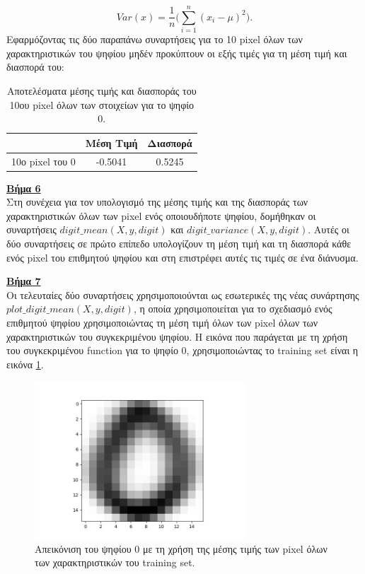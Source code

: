 \documentclass[11pt]{article} %
\begin{document}
\begin{equation}
\label{variance}
Var(x) = \frac{1}{n}\bigg(\sum_{i=1}^{n}(x_{i}-\mu)^{2}\bigg).
\end{equation}
Εφαρμόζοντας τις δύο παραπάνω συναρτήσεις για το 10 pixel όλων των χαρακτηριστικών του ψηφίου μηδέν προκύπτουν οι εξής τιμές για τη μέση τιμή και διασπορά του:

\begin{table}[h]
\begin{center}
\begin{tabular}{c c c}
\hline\hline
 & Μέση Τιμή & Διασπορά\\
\hline
10ο pixel του 0 & -0.5041 & 0.5245\\
\hline 
\end{tabular}
\caption{Αποτελέσματα μέσης τιμής και διασποράς του 10ου pixel όλων των στοιχείων για το ψηφίο 0.}
\end{center}
\end{table}

\underline{\textbf{Βήμα 6}}\\

Στη συνέχεια για τον υπολογισμό της μέσης τιμής και της διασποράς των χαρακτηριστικών όλων των pixel ενός οποιουδήποτε ψηφίου, δομήθηκαν οι συναρτήσεις $digit\_mean(X, y, digit)$ και $digit\_variance(X, y, digit)$. Αυτές οι δύο συναρτήσεις σε πρώτο επίπεδο υπολογίζουν τη μέση τιμή και τη διασπορά κάθε ενός pixel του επιθμητού ψηφίου και στη επιστρέφει αυτές τις τιμές σε ένα διάνυσμα. 

\underline{\textbf{Βήμα 7}}\\

Οι τελευταίες δύο συναρτήσεις χρησιμοποιούνται ως εσωτερικές της νέας συνάρτησης $plot\_digit\_mean(X, y, digit)$, η οποία χρησιμοποιείται για το σχεδιασμό ενός επιθμητού ψηφίου χρησιμοποιώντας τη μέση τιμή όλων των pixel όλων των χαρακτηριστικών του συγκεκριμένου ψηφίου. Η εικόνα που παράγεται με τη χρήση του συγκεκριμένου function για το ψηφίο 0, χρησιμοποιώντας το training set είναι η εικόνα \ref{fig:step_7}.

\begin{figure}[H]
    \centering
    \includegraphics[width=0.7\textwidth]{plots/Step 7}
    \caption{Απεικόνιση του ψηφίου 0 με τη χρήση της μέσης τιμής των pixel όλων των χαρακτηριστικών του training set.}
    \label{fig:step_7}
\end{figure}
\end{document}

